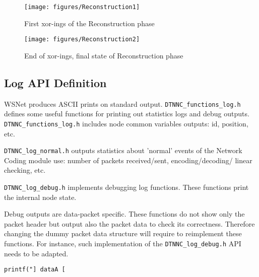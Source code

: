 \documentclass[a4paper,twoside]{article}
\begin{document}
\begin{enumerate}
\begin{figure}[!hbt]
\centering
\texttt{[image: figures/Reconstruction1]}
\caption{First xor-ings of the Reconstruction phase}
\label{fig:rc1}
\end{figure}

\begin{figure}[!hbt]
\centering
\texttt{[image: figures/Reconstruction2]}
\caption{End of xor-ings, final state of Reconstruction phase}
\label{fig:rc2}
\end{figure}

\end{enumerate}

\newpage

\subsection{Log API Definition}
\label{section:log-api}

WSNet produces ASCII prints on standard output. \texttt{DTNNC\_functions\_log.h} defines some useful functions for printing out statistics logs and debug outputs. \texttt{DTNNC\_functions\_log.h} includes node common variables outputs: id, position, etc.



\texttt{DTNNC\_log\_normal.h} outputs statistics about 'normal' events of the Network Coding module use: number of packets received/sent, encoding/decoding/ linear checking, etc.



\texttt{DTNNC\_log\_debug.h} implements debugging log functions. These functions print the internal node state.



Debug outputs are data-packet specific. These functions do not show only the packet header but output also the packet data to check its correctness. Therefore changing the dummy packet data structure will require to reimplement these functions. For instance, such implementation of the \texttt{DTNNC\_log\_debug.h} API needs to be adapted.
\begin{lstlisting}
printf("] dataA [\end{lstlisting}
\end{document}
